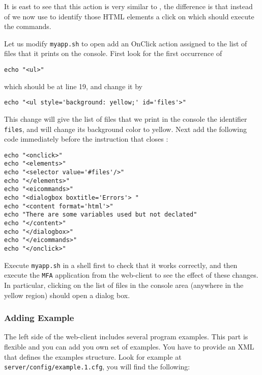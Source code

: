 \medskip
\noindent
It is east to see that this action is very similar to
, the difference is that instead of  we
now use  to identify those HTML elements a click on
which should execute the commands. 

Let us modify \texttt{myapp.sh} to open add an OnClick action assigned
to the list of files that it prints on the console. First look for the
first occurrence of 

\medskip
\begin{lstlisting}[style=script]
echo "<ul>"
\end{lstlisting}

\medskip
\noindent
which should be at line 19, and change it by

\medskip
\begin{lstlisting}[style=script]
echo "<ul style='background: yellow;' id='files'>"
\end{lstlisting}

\medskip
\noindent
This change will give the list of files that we print in the console
the identifier \texttt{files}, and will change its background color to
yellow. Next add the following code immediately before the instruction
that closes :

\medskip
\begin{lstlisting}[style=script]
echo "<onclick>"
echo "<elements>"
echo "<selector value='#files'/>"
echo "</elements>"
echo "<eicommands>"
echo "<dialogbox boxtitle='Errors'> "
echo "<content format='html'>"
echo "There are some variables used but not declated"
echo "</content>"
echo "</dialogbox>"
echo "</eicommands>"
echo "</onclick>"
\end{lstlisting}

\medskip
\noindent
Execute \texttt{myapp.sh} in a shell first to check that it works
correctly, and then execute the \texttt{MFA} application from the
web-client to see the effect of these changes. In particular, clicking
on the list of files in the console area (anywhere in the yellow
region) should open a dialog box.

\subsubsection{Adding Example}

The left side of the web-client includes several program
examples. This part is flexible and you can add you own set of
examples. You have to provide an XML that defines the examples
structure. Look for example at \texttt{server/config/example.1.cfg},
you will find the following:

